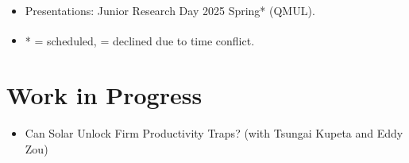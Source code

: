 \documentclass[11pt,letterpaper]{report}
\begin{document}
\begin{itemize}
\begin{itemize}[leftmargin=1em]
            \small
            \item Presentations: Junior Research Day 2025 Spring* (QMUL).
            \item * = scheduled, \textsuperscript{\textdagger} = declined due to time conflict.
        \end{itemize}

    \end{itemize}

    \section*{Work in Progress}
    \begin{itemize}
        \item Can Solar Unlock Firm Productivity Traps? (with Tsungai Kupeta and Eddy Zou)
    \end{itemize}
\end{document}
